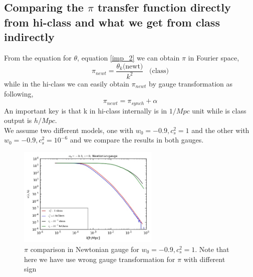 \documentclass[a4paper,14pt]{article}
\newcommand {\be}{\begin{equation}}
\newcommand {\ee}{\end{equation}}
\begin{document}
\subsection{Comparing the  ${\pi}$ transfer function directly from hi-class and what we get from class indirectly}
From the equation for $\theta$, equation \ref{imp_2} we can obtain $\pi$ in Fourier space,
\be
\pi_{newt}=\frac{\theta_k\text{(newt)}}{k^2}  \; \; \; \text{(class)}
\ee
while in the hi-class we can easily obtain $\pi_{newt}$ by gauge transformation as following,
\be
\pi_{newt}= \pi_{synch}+ \alpha
\ee
An important key is that k in hi-class internally is in $1/Mpc$ unit while is class output is $h/Mpc$.\\
We assume two different models, one with $w_0=-0.9, c_s^2=1$ and the other with $w_0=-0.9, c_s^2=10^{-6}$ and we compare the results in both gauges. %
\begin{figure}[H]
\begin{center}
\captionsetup{,margin=1cm}
\includegraphics[width=0.60\textwidth]{pi_comp} 
\caption{$\pi$ comparison in Newtonian gauge for $w_0=-0.9, c_s^2=1$. Note that here we have use wrong gauge transformation for $\pi$ with different sign}
\end{center}
\end{figure}
\end{document}
